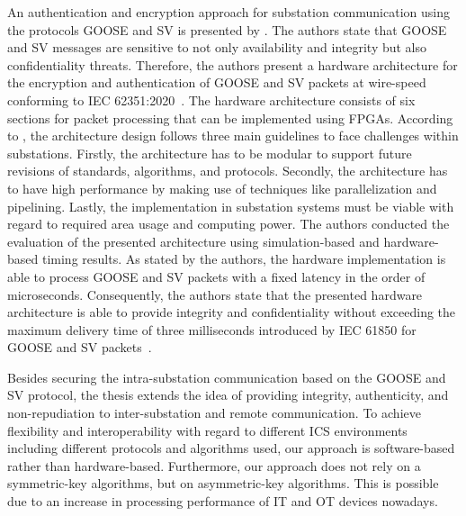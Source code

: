 An authentication and encryption approach for substation communication using the protocols GOOSE and SV is presented by \citeauthor{Rodriguez2021} \cite{Rodriguez2021}.
The authors state that GOOSE and SV messages are sensitive to not only availability and integrity but also confidentiality threats.
Therefore, the authors present a hardware architecture for the encryption and authentication of GOOSE and SV packets at wire-speed conforming to IEC 62351:2020~\cite{IEC62351P6}.
The hardware architecture consists of six sections for packet processing that can be implemented using FPGAs.
According to \citeauthor{Rodriguez2021}, the architecture design follows three main guidelines to face challenges within substations.
Firstly, the architecture has to be modular to support future revisions of standards, algorithms, and protocols.
Secondly, the architecture has to have high performance by making use of techniques like parallelization and pipelining.
Lastly, the implementation in substation systems must be viable with regard to required area usage and computing power.
The authors conducted the evaluation of the presented architecture using simulation-based and hardware-based timing results.
As stated by the authors, the hardware implementation is able to process GOOSE and SV packets with a fixed latency in the order of microseconds.
Consequently, the authors state that the presented hardware architecture is able to provide integrity and confidentiality without exceeding the maximum delivery time of three milliseconds introduced by IEC 61850 for GOOSE and SV packets~\cite{IEC61850P5}.

Besides securing the intra-substation communication based on the GOOSE and SV protocol, the thesis extends the idea of providing integrity, authenticity, and non-repudiation to inter-substation and remote communication.
To achieve flexibility and interoperability with regard to different ICS environments including different protocols and algorithms used, our approach is software-based rather than hardware-based.
Furthermore, our approach does not rely on a symmetric-key algorithms, but on asymmetric-key algorithms.
This is possible due to an increase in processing performance of IT and OT devices nowadays.

